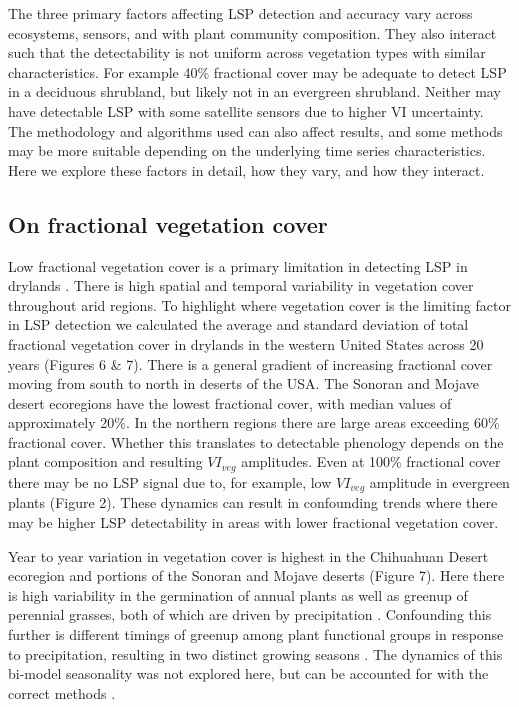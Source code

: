 \documentclass{article}
\begin{document}
The three primary factors affecting LSP detection and accuracy vary across ecosystems, sensors, and with plant community composition. They also interact such that the detectability is not uniform across vegetation types with similar characteristics. For example 40\% fractional cover may be adequate to detect LSP in a deciduous shrubland, but likely not in an evergreen shrubland. Neither may have detectable LSP with some satellite sensors due to higher VI uncertainty. The methodology and algorithms used can also affect results, and some methods may be more suitable depending on the underlying time series characteristics. Here we explore these factors in detail, how they vary, and how they interact. 

\subsection{On fractional vegetation cover}
Low fractional vegetation cover is a primary limitation in detecting LSP in drylands \cite{smith2019}. There is high spatial and temporal variability in vegetation cover throughout arid regions. To highlight where vegetation cover is the limiting factor in LSP detection we calculated the average and standard deviation of total fractional vegetation cover in drylands in the western United States across 20 years (Figures 6 \& 7). There is a general gradient of increasing fractional cover moving from south to north in deserts of the USA. The Sonoran and Mojave desert ecoregions have the lowest fractional cover, with median values of approximately 20\%. In the northern regions there are large areas exceeding 60\% fractional cover. Whether this translates to detectable phenology depends on the plant composition and resulting $VI_{veg}$ amplitudes. Even at 100\% fractional cover there may be no LSP signal due to, for example, low $VI_{veg}$ amplitude in evergreen plants (Figure 2). These dynamics can result in confounding trends where there may be higher LSP detectability in areas with lower fractional vegetation cover.

Year to year variation in vegetation cover is highest in the Chihuahuan Desert ecoregion and portions of the Sonoran and Mojave deserts (Figure 7). Here there is high variability in the germination of annual plants as well as greenup of perennial grasses, both of which are driven by precipitation \cite{beatley1974a, browning2017b}. Confounding this further is different timings of greenup among plant functional groups in response to precipitation, resulting in two distinct growing seasons \cite{ernest2000, weiss2004, browning2018}. The dynamics of this bi-model seasonality was not explored here, but can be accounted for with the correct methods \cite{gray2019, buitenwerf2015}.
\end{document}
